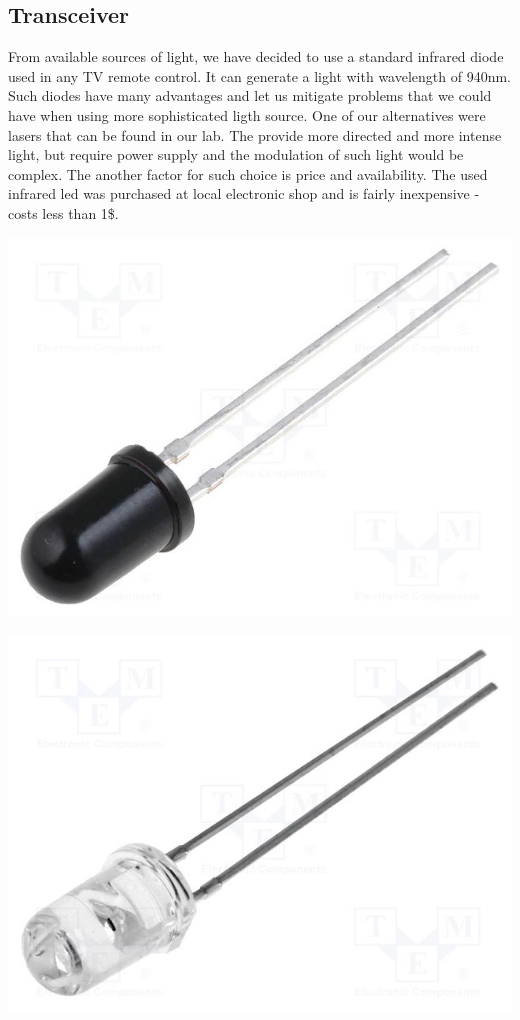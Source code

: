 \documentclass[12pt]{article}
\begin{document}
  \subsection{Transceiver}
  From available sources of light, we have decided to use a standard infrared diode used in any TV remote control. It can generate a light with wavelength of 940nm.
  Such diodes have many advantages and let us mitigate problems that we could have when using more sophisticated ligth source. One of our alternatives were lasers that
  can be found in our lab. The provide more directed and more intense light, but require power supply and the modulation of such light would be complex.
  The another factor for such choice is price and availability. The used infrared led was purchased at local electronic shop and is fairly inexpensive - costs less than 1\$.
  \begin{multicols}{2}
    \centering
    \includegraphics[scale=0.6]{photodiode.jpg}
     \par
    \includegraphics[scale=0.6]{ir_diode.jpg}
  \end{multicols}
  
\end{document}
